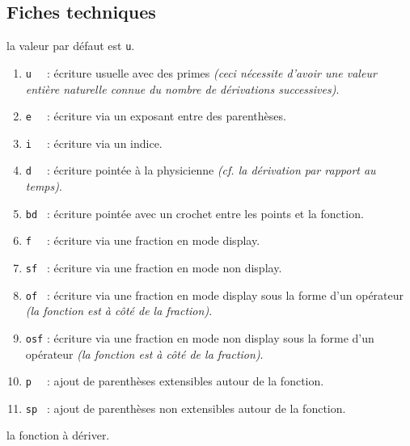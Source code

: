 \documentclass[12pt,a4paper]{article}
\begin{document}


\subsection{Fiches techniques}


\IDoption{} la valeur par défaut est \verb+u+. 
\begin{enumerate}
	\item \verb+u  + : écriture usuelle avec des primes \emph{(ceci nécessite d'avoir une valeur entière naturelle connue du nombre de dérivations successives)}.

	\item \verb+e  + : écriture via un exposant entre des parenthèses.
	
	\item \verb+i  + : écriture via un indice.

	\item \verb+d  + : écriture pointée à la physicienne \emph{(cf. la dérivation par rapport au temps)}.

	\item \verb+bd + : écriture pointée avec un crochet entre les points et la fonction.

	\medskip
	
	\item \verb+f  + : écriture via une fraction en mode display.

	\item \verb+sf + : écriture via une fraction en mode non display.

	\item \verb+of + : écriture via une fraction en mode display sous la forme d'un opérateur \emph{(la fonction est à côté de la fraction)}.

	\item \verb+osf+ : écriture via une fraction en mode non display sous la forme d'un opérateur \emph{(la fonction est à côté de la fraction)}.

	\medskip
	
	\item \verb+p  + : ajout de parenthèses extensibles autour de la fonction.

	\item \verb+sp + : ajout de parenthèses non extensibles autour de la fonction.
\end{enumerate}


 la fonction à dériver.
\end{document}
